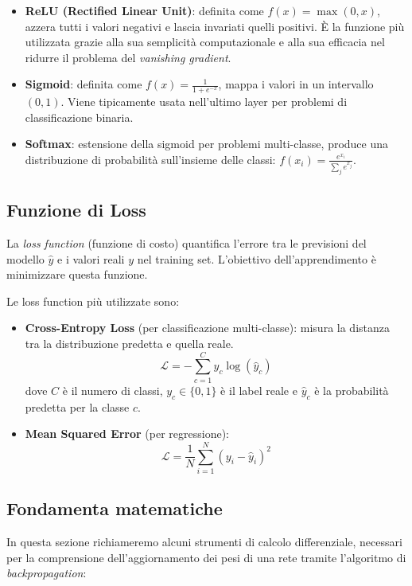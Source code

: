 \begin{itemize}
	\item \textbf{ReLU (Rectified Linear Unit)}: definita come $f(x) = \max(0, x)$, azzera tutti i valori negativi e lascia invariati quelli positivi. È la funzione più utilizzata grazie alla sua semplicità computazionale e alla sua efficacia nel ridurre il problema del \textit{vanishing gradient}.
	\item \textbf{Sigmoid}: definita come $f(x) = \frac{1}{1 + e^{-x}}$, mappa i valori in un intervallo $(0, 1)$. Viene tipicamente usata nell'ultimo layer per problemi di classificazione binaria.
	\item \textbf{Softmax}: estensione della sigmoid per problemi multi-classe, produce una distribuzione di probabilità sull'insieme delle classi: $f(x_i) = \frac{e^{x_i}}{\sum_j e^{x_j}}$.
\end{itemize}

\subsection{Funzione di Loss}

La \emph{loss function} (funzione di costo) quantifica l'errore tra le previsioni del modello $\hat{y}$ e i valori reali $y$ nel training set. L'obiettivo dell'apprendimento è minimizzare questa funzione.

Le loss function più utilizzate sono:

\begin{itemize}
	\item \textbf{Cross-Entropy Loss} (per classificazione multi-classe): misura la distanza tra la distribuzione predetta e quella reale.
	\[
	\mathcal{L} = -\sum_{c=1}^{C} y_c \log(\hat{y}_c)
	\]
	dove $C$ è il numero di classi, $y_c \in \{0,1\}$ è il label reale e $\hat{y}_c$ è la probabilità predetta per la classe $c$.
	
	\item \textbf{Mean Squared Error} (per regressione):
	\[
	\mathcal{L} = \frac{1}{N} \sum_{i=1}^{N} (y_i - \hat{y}_i)^2
	\]
\end{itemize}

\subsection{Fondamenta matematiche}
In questa sezione richiameremo alcuni strumenti di calcolo differenziale, necessari per la comprensione dell'aggiornamento dei pesi di una rete tramite l'algoritmo di \emph{backpropagation}:


